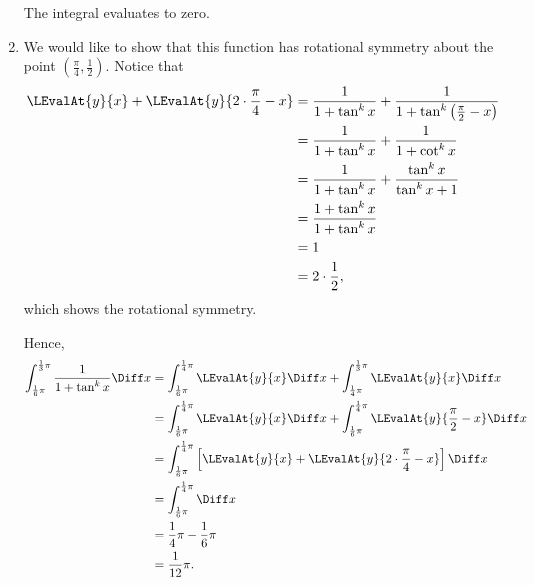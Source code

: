 \begin{enumerate}
          The integral evaluates to zero.

    \item We would like to show that this function has rotational symmetry about the point \(\left(\frac{\pi}{4}, \frac{1}{2}\right)\). Notice that
          \begin{align*}
              \LEvalAt{y}{x} + \LEvalAt{y}{2 \cdot \frac{\pi}{4} - x} & = \frac{1}{1 + \tan^k x} + \frac{1}{1 + \tan^k \left(\frac{\pi}{2} - x\right)} \\
                                                                      & = \frac{1}{1 + \tan^k x} + \frac{1}{1 + \cot^k x}                              \\
                                                                      & = \frac{1}{1 + \tan^k x} + \frac{\tan^k x}{\tan^k x + 1}                       \\
                                                                      & = \frac{1 + \tan^k x}{1 + \tan^k x}                                            \\
                                                                      & = 1                                                                            \\
                                                                      & = 2 \cdot \frac{1}{2},
          \end{align*}
          which shows the rotational symmetry.

          Hence,
          \begin{align*}
              \int_{\frac{1}{6}\pi}^{\frac{1}{3}\pi} \frac{1}{1 + \tan^k x} \Diff x & =  \int_{\frac{1}{6}\pi}^{\frac{1}{4}\pi} \LEvalAt{y}{x} \Diff x + \int_{\frac{1}{4}\pi}^{\frac{1}{3}\pi} \LEvalAt{y}{x} \Diff x                \\
                                                                                    & = \int_{\frac{1}{6}\pi}^{\frac{1}{4}\pi} \LEvalAt{y}{x} \Diff x + \int_{\frac{1}{6}\pi}^{\frac{1}{4}\pi} \LEvalAt{y}{\frac{\pi}{2} - x} \Diff x \\
                                                                                    & = \int_{\frac{1}{6}\pi}^{\frac{1}{4}\pi} \left[\LEvalAt{y}{x} + \LEvalAt{y}{2 \cdot \frac{\pi}{4} - x}\right] \Diff x                           \\
                                                                                    & = \int_{\frac{1}{6}\pi}^{\frac{1}{4}\pi} \Diff x                                                                                                \\
                                                                                    & = \frac{1}{4} \pi - \frac{1}{6}\pi                                                                                                              \\
                                                                                    & = \frac{1}{12} \pi.
          \end{align*}
\end{enumerate}